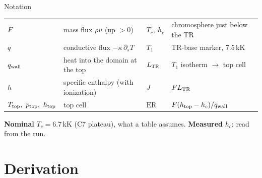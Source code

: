 \documentclass[aspectratio=169,10pt]{beamer}
\newcommand{\ptop}{p_{\rm top}}
\newcommand{\Ttop}{T_{\rm top}}
\newcommand{\htop}{h_{\rm top}}
\newcommand{\qwall}{q_{\rm wall}}
\newcommand{\LTR}{L_{\rm TR}}
\newcommand{\ER}{\mathrm{ER}}
\begin{document}
\begin{frame}{Notation}
  \small
  \centering
  \begin{tabular}{@{}ll@{\qquad}ll@{}}
    \toprule
    $F$ & mass flux $\rho u$ (up $>0$) & $T_c,\ h_c$ & chromosphere just below the TR \\
    $q$ & conductive flux $-\kappa\,\partial_s T$ & $T_1$ & TR-base marker, 7.5\,kK \\
    $\qwall$ & heat into the domain at the top & $\LTR$ & $T_1$ isotherm $\to$ top cell \\
    $h$ & specific enthalpy (with ionization) & $J$ & $F\LTR$ \\
    $\Ttop,\ \ptop,\ \htop$ & top cell & $\ER$ & $F(\htop-h_c)/\qwall$ \\
    \bottomrule
  \end{tabular}
  \vspace{16pt}

  \textbf{Nominal} $T_c = 6.7$\,kK (C7 plateau), what a table assumes.\quad
  \textbf{Measured} $h_c$: read from the run.
\end{frame}

\section{Derivation}
\end{document}
